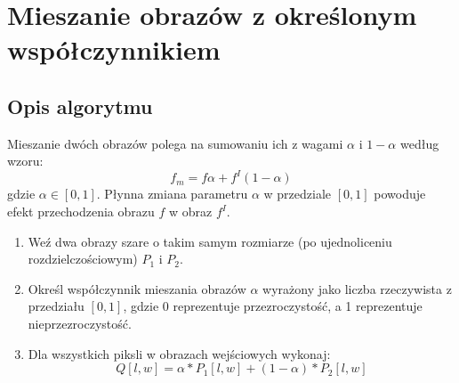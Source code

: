 \documentclass[a4paper,12pt, titlepage]{report}
\begin{document}
\section{Mieszanie obrazów z określonym współczynnikiem}
\subsection*{Opis algorytmu}
\par Mieszanie dwóch obrazów polega na sumowaniu ich z wagami \(\alpha\) i \(1-\alpha\) według wzoru: \[f_{m}=f\alpha+f^{I}(1-\alpha)\] gdzie \(\alpha\in[0,1]\). Płynna zmiana parametru \(\alpha\) w przedziale \([0,1]\) powoduje efekt przechodzenia obrazu \(f\) w obraz \(f^{I}\).
\begin{enumerate}
\item Weź dwa obrazy szare o takim samym rozmiarze (po ujednoliceniu rozdzielczościowym) \(P_{1}\) i \(P_{2}\).
\item Określ współczynnik mieszania obrazów \(\alpha\) wyrażony jako liczba rzeczywista z przedziału \([0,1]\), gdzie 0 reprezentuje przezroczystość, a 1 reprezentuje nieprzezroczystość.
\item Dla wszystkich piksli w obrazach wejściowych wykonaj: \[Q[l,w]=\alpha*P_{1}[l,w]+(1-\alpha)*P_{2}[l,w]\]
\end{enumerate}
\end{document}
